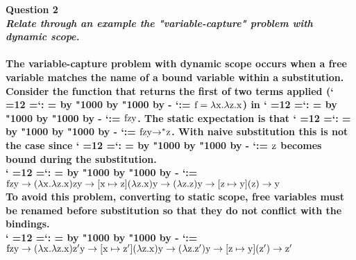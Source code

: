 \documentclass[12pt,letterpaper]{article}
\makeatletter
\newcommand{\hwSect}[1] {\noindent\large\bf#1\rm\normalsize}
\newenvironment{lambdac}
  {\catcode` =12 \setupspace
   \makeordinary{:}%
   $\mathgroup0 }
  {$}
{\catcode` =\active\gdef\setupspace{\def {\;}}}
\newcommand{\makeordinary}[1]{\@tempcnta=\mathcode`#1
  \@tempcntb=\@tempcnta
  \divide\@tempcntb by "1000
  \multiply\@tempcntb by "1000
  \advance\@tempcnta by -\@tempcntb
  \mathcode`#1=\@tempcnta}
\makeatother
\begin{document}
\pagebreak

\hwSect{Question 2}\\
{\it Relate through an example the "variable-capture" problem with dynamic scope.} \\ \\
The variable-capture problem with dynamic scope occurs when a free variable matches the name of a bound variable within a substitution.\\

\noindent
Consider the function that returns the first of two terms applied (\begin{lambdac}f=\lambda x.\lambda z.x\end{lambdac})
in \begin{lambdac}f z y\end{lambdac}. The static expectation is that \begin{lambdac}f z y {\rightarrow}^{\ast} z\end{lambdac}. With naive substitution this is not the case since \begin{lambdac}z\end{lambdac} becomes bound during the substitution.\\

\noindent
\begin{lambdac}f z y \rightarrow (\lambda x.\lambda z.x) z y \rightarrow [x \mapsto z](\lambda z.x) y \rightarrow (\lambda z.z) y \rightarrow [z \mapsto y](z) \rightarrow y\end{lambdac}\\

\noindent
To avoid this problem, converting to static scope, free variables must be renamed before substitution so that they do not conflict with the bindings.\\

\noindent
\begin{lambdac}f z y \rightarrow (\lambda x.\lambda z.x) z' y \rightarrow [x \mapsto z'](\lambda z.x) y \rightarrow (\lambda z.z') y \rightarrow [z \mapsto y](z') \rightarrow z'\end{lambdac}
\end{document}
